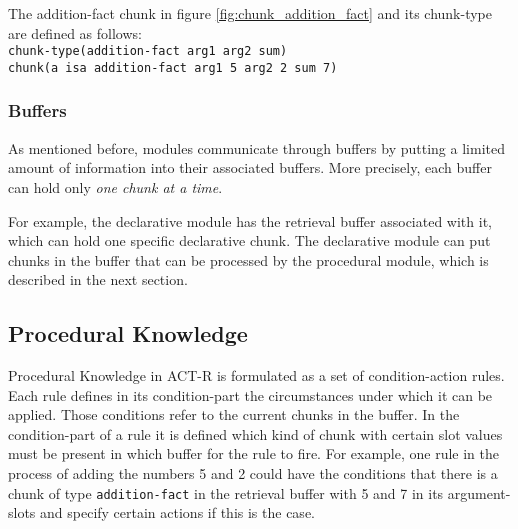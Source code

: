 \begin{example}
 The addition-fact chunk in figure \ref{fig:chunk_addition_fact} and its chunk-type are defined as follows:\\
 \verb|chunk-type(addition-fact arg1 arg2 sum)|\\
 \verb|chunk(a isa addition-fact arg1 5 arg2 2 sum 7)|
\end{example}

\subsubsection{Buffers}

As mentioned before, modules communicate through buffers by putting a limited amount of information into their associated buffers. More precisely, each buffer can hold only \emph{one chunk at a time}.

For example, the declarative module has the retrieval buffer associated with it, which can hold one specific declarative chunk. The declarative module can put chunks in the buffer that can be processed by the procedural module, which is described in the next section.

\subsection{Procedural Knowledge}

Procedural Knowledge in ACT-R is formulated as a set of condition-action rules. Each rule defines in its condition-part the circumstances under which it can be applied. Those conditions refer to the current chunks in the buffer. In the condition-part of a rule it is defined which kind of chunk with certain slot values must be present in which buffer for the rule to fire. For example, one rule in the process of adding the numbers 5 and 2 could have the conditions that there is a chunk of type \verb|addition-fact| in the retrieval buffer with 5 and 7 in its argument-slots and specify certain actions if this is the case.

